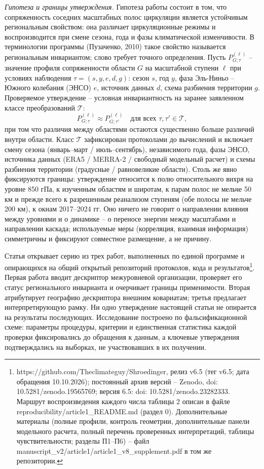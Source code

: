 \documentclass[12pt,a4paper]{article}
\begin{document}
\emph{Гипотеза и границы утверждения.} Гипотеза работы состоит в том, что сопряженность соседних масштабных полос циркуляции является устойчивым региональным свойством: она различает циркуляционные режимы и воспроизводится при смене сезона, года и фазы климатической изменчивости. В терминологии программы (Пузаченко, 2010) такое свойство называется региональным инвариантом; слово требует точного определения. Пусть $P^{(\ell)}_{G;\tau}$ -- значение профиля сопряженности области $G$ на масштабной ступени $\ell$ при условиях наблюдения $\tau = (s, y, e, d, g)$: сезон $s$, год $y$, фаза Эль-Ниньо -- Южного колебания (ЭНСО) $e$, источник данных $d$, схема разбиения территории $g$. Проверяемое утверждение -- условная инвариантность на заранее заявленном классе преобразований $\mathcal{T}$:
\begin{equation}
\label{eq:inv}
P^{(\ell)}_{G;\tau} \approx P^{(\ell)}_{G;\tau'} \quad \text{для всех } \tau, \tau' \in \mathcal{T},
\end{equation}
при том что различия между областями остаются существенно больше различий внутри области. Класс $\mathcal{T}$ зафиксирован протоколами до вычислений и включает смену сезона (январь--март / июль--сентябрь), независимого года, фазы ЭНСО, источника данных (ERA5 / MERRA-2 / свободный модельный расчет) и схемы разбиения территории (градусные / равновеликие области). Столь же явно фиксируются границы: утверждение относится к полю относительного вихря на уровне 850 гПа, к изученным областям и широтам, к парам полос не мельче 50 км и прежде всего к разрешенным реанализом ступеням (обе полосы не мельче 200 км), к окнам 2017--2024 гг. Оно ничего не говорит о направлении влияния между уровнями и о динамике -- о переносе энергии между масштабами и направлении каскада; используемые меры (корреляция, взаимная информация) симметричны и фиксируют совместное размещение, а не причину.

Статья открывает серию из трех работ, выполненных по единой программе и опирающихся на общий открытый репозиторий протоколов, кода и результатов\footnote{https://github.com/Theclimateguy/Shroedinger, релиз v6.5 (тег v6.5; дата обращения 10.10.2026); постоянный архив версий -- Zenodo, doi: 10.5281/zenodo.19565769; версия 6.5: doi: 10.5281/zenodo.23282333. Маршрут воспроизведения каждого числа таблицы 2 описан в файле reproducibility/article1\_README.md (раздел 0). Дополнительные материалы (полные профили, контроль геометрии, дополнительные панели модельного расчета, полный перечень проверенных интерпретаций, таблицы чувствительности; разделы П1--П6) -- файл manuscript\_v2/article1/article1\_v8\_supplement.pdf в том же репозитории.}. Первая работа вводит дескриптор межуровневой организации, проверяет его статус регионального инварианта и очерчивает границы применимости. Вторая атрибутирует географию дескриптора внешним ковариатам; третья предлагает интерпретирующую рамку. Ни одно утверждение настоящей статьи не опирается на результаты последующих. Исследование построено по фальсификационной схеме: параметры процедуры, критерии и единственная статистика каждой проверки фиксировались до обращения к данным, а ключевые утверждения подтверждались на выборках, не участвовавших в их получении.
\end{document}
